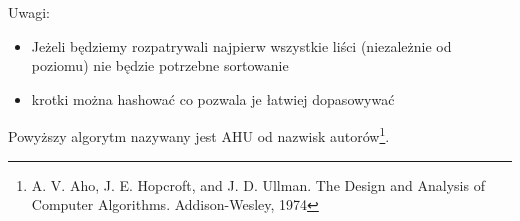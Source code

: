 Uwagi:
\begin{itemize}
\item Jeżeli będziemy rozpatrywali najpierw wszystkie liści (niezależnie od poziomu) nie będzie potrzebne sortowanie
\item krotki można hashować co pozwala je łatwiej dopasowywać
\end{itemize}

Powyższy algorytm nazywany jest AHU od nazwisk autorów\footnote{A. V. Aho, J. E. Hopcroft, and J. D. Ullman. The Design and Analysis of Computer Algorithms. Addison-Wesley, 1974}.

